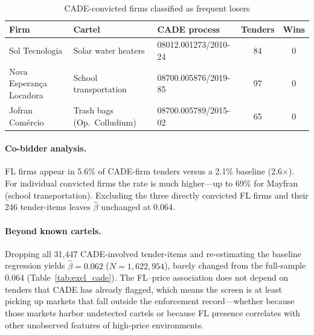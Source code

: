 \begin{table}[htbp]
\centering
\caption{CADE-convicted firms classified as frequent losers}
\label{tab:cade_fl_firms}
\small
\begin{tabular}{lllcc}
\toprule
Firm & Cartel & CADE process & Tenders & Wins \\
\midrule
Sol Tecnologia & Solar water heaters & 08012.001273/2010-24 & 84 & 0 \\
Nova Esperan\c{c}a Locadora & School transportation & 08700.005876/2019-85 & 97 & 0 \\
Jofran Com\'ercio & Trash bags (Op.\ Colludium) & 08700.005789/2015-02 & 65 & 0 \\
\bottomrule
\end{tabular}
\end{table}

\paragraph{Co-bidder analysis.}
FL firms appear in 5.6\% of CADE-firm tenders versus a 2.1\% baseline
(2.6$\times$). For individual convicted firms the rate is much
higher---up to 69\% for Mayfran (school transportation). Excluding
the three directly convicted FL firms and their 246 tender-items
leaves $\hat{\beta}$ unchanged at 0.064.

\paragraph{Beyond known cartels.}
Dropping all 31,447 CADE-involved tender-items and re-estimating the
baseline regression yields $\hat{\beta} = 0.062$ ($N =
1{,}622{,}954$), barely changed from the full-sample 0.064
(Table~\ref{tab:excl_cade}). The FL--price association does not
depend on tenders that CADE has already flagged, which means the
screen is at least picking up markets that fall outside the
enforcement record---whether because those markets harbor undetected
cartels or because FL presence correlates with other unobserved
features of high-price environments.

